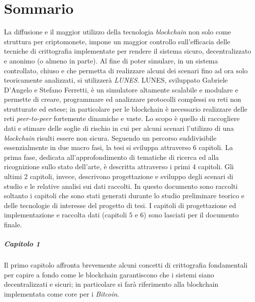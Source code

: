 \chapter*{Sommario}
La diffusione e il maggior utilizzo della tecnologia \textit{blockchain} non solo come struttura per criptomonete, impone un maggior controllo sull'efficacia delle tecniche di crittografia implementate per rendere il sistema sicuro, decentralizzato e anonimo (o almeno in parte).\newline
Al fine di poter simulare, in un sistema controllato, chiuso e che permetta di realizzare alcuni dei scenari fino ad ora solo teoricamente analizzati, si utilizzerà \textit{LUNES}\cite{gdalunes}.\newline
LUNES, sviluppato Gabriele D'Angelo e Stefano Ferretti, è un simulatore altamente scalabile e modulare e permette di creare, programmare ed analizzare protocolli complessi su reti non strutturate ed estese; in particolare per le blockchain è necessario realizzare delle reti \textit{peer-to-peer} fortemente dinamiche e vaste.\newline
Lo scopo è quello di raccogliere dati e stimare delle soglie di rischio in cui per alcuni scenari l'utilizzo di una \textit{blockchain} risulti essere non sicura.\newline\newline
Seguendo un percorso suddivisibile essenzialmente in due macro fasi, la tesi si sviluppa attraverso 6 capitoli. La prima fase, dedicata all'approfondimento di tematiche di ricerca ed alla ricognizione sullo stato dell'arte, è descritta attraverso i primi 4 capitoli. Gli ultimi 2 capitoli, invece, descrivono progettazione e sviluppo degli scenari di studio e le relative analisi sui dati raccolti.\newline
In questo documento sono raccolti soltanto i capitoli che sono stati generati durante lo studio preliminare teorico e delle tecnologie di interesse del progetto di tesi. I capitoli di progettazione ed implementazione e raccolta dati (capitoli $5$ e $6$) sono lasciati per il documento finale.

\paragraph{Capitolo 1}
Il primo capitolo affronta brevemente alcuni concetti di crittografia fondamentali per capire a fondo come le blockchain garantiscono che i sistemi siano decentralizzati e sicuri; in particolare si farà riferimento alla blockchain implementata come core per i \textit{Bitcoin}.

